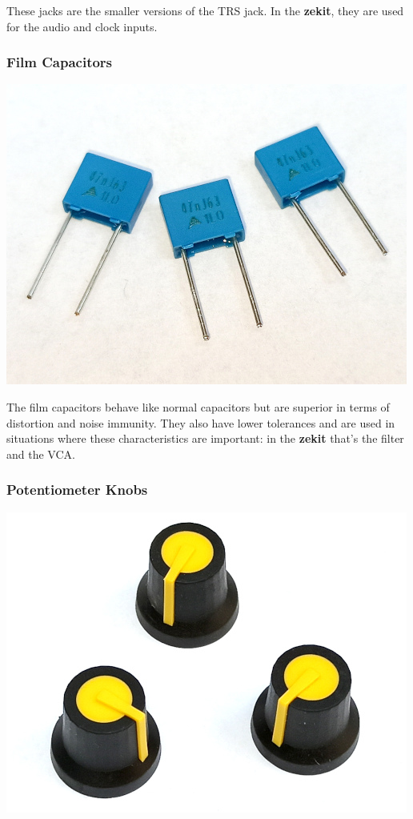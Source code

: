 \documentclass{scrartcl}
\begin{document}
These jacks are the smaller versions of the TRS jack. In the \textbf{zekit}, they are used for the audio and clock inputs.

\subsubsection{Film Capacitors}

\begin{center}
    \includegraphics[scale=0.5]{assets/zekit-filmcaps-resized.jpg}
\end{center}

The film capacitors behave like normal capacitors but are superior in terms of distortion and noise immunity. They also have lower tolerances and are used in situations where these characteristics are important: in the \textbf{zekit} that's the filter and the VCA.

\subsubsection{Potentiometer Knobs}

\begin{center}
    \includegraphics[scale=0.5]{assets/zekit-knobs-resized.jpg}
\end{center}
\end{document}
